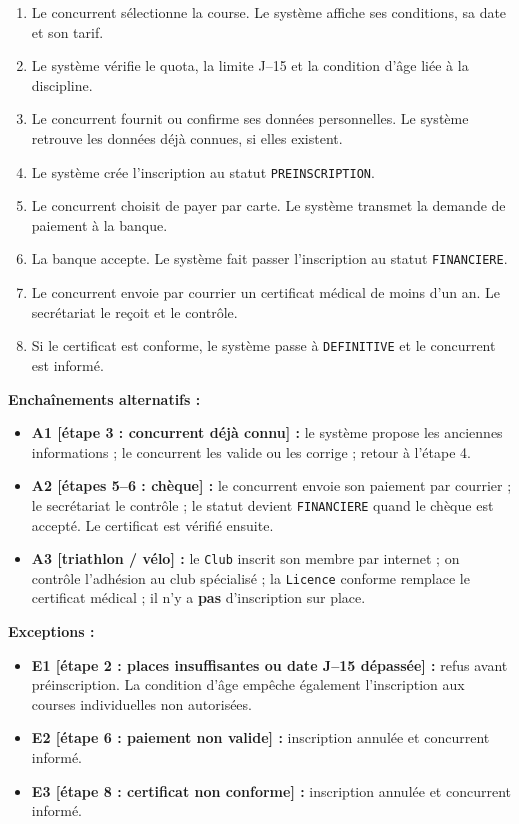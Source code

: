 \begin{enumerate}[label=\textbf{\arabic*.}]
\item Le concurrent sélectionne la course. Le système affiche ses conditions, sa date et son tarif.
\item Le système vérifie le quota, la limite J--15 et la condition d'âge liée à la discipline.
\item Le concurrent fournit ou confirme ses données personnelles. Le système retrouve les données déjà connues, si elles existent.
\item Le système crée l'inscription au statut \texttt{PREINSCRIPTION}.
\item Le concurrent choisit de payer par carte. Le système transmet la demande de paiement à la banque.
\item La banque accepte. Le système fait passer l'inscription au statut \texttt{FINANCIERE}.
\item Le concurrent envoie par courrier un certificat médical de moins d'un an. Le secrétariat le reçoit et le contrôle.
\item Si le certificat est conforme, le système passe à \texttt{DEFINITIVE} et le concurrent est informé.
\end{enumerate}
\textbf{Enchaînements alternatifs :}
\begin{itemize}
\item \textbf{A1 [étape 3 : concurrent déjà connu] :} le système propose les anciennes informations ; le concurrent les valide ou les corrige ; retour à l'étape 4.
\item \textbf{A2 [étapes 5--6 : chèque] :} le concurrent envoie son paiement par courrier ; le secrétariat le contrôle ; le statut devient \texttt{FINANCIERE} quand le chèque est accepté. Le certificat est vérifié ensuite.
\item \textbf{A3 [triathlon / vélo] :} le \texttt{Club} inscrit son membre par internet ; on contrôle l'adhésion au club spécialisé ; la \texttt{Licence} conforme remplace le certificat médical ; il n'y a \textbf{pas} d'inscription sur place.
\end{itemize}
\textbf{Exceptions :}
\begin{itemize}
\item \textbf{E1 [étape 2 : places insuffisantes ou date J--15 dépassée] :} refus avant préinscription. La condition d'âge empêche également l'inscription aux courses individuelles non autorisées.
\item \textbf{E2 [étape 6 : paiement non valide] :} inscription annulée et concurrent informé.
\item \textbf{E3 [étape 8 : certificat non conforme] :} inscription annulée et concurrent informé.
\end{itemize}
